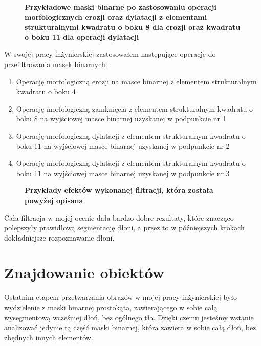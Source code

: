 \documentclass[a4paper,12pt,twoside,openany]{report}
\newcommand{\ImgPath}{.}
\begin{document}
\begin{figure}[H]
	\centering
	\caption{  \textbf{Przykładowe maski binarne po zastosowaniu operacji morfologicznych erozji oraz dylatacji z elementami strukturalnymi kwadratu o boku 8 dla erozji oraz kwadratu o boku 11 dla operacji dylatacji}}
\end{figure}

W swojej pracy inżynierskiej zastosowałem następujące operacje do przefiltrowania masek binarnych: 
\begin{enumerate}
	\item Operację morfologiczną erozji na masce binarnej z elementem strukturalnym kwadratu o boku 4
	\item Operację morfologiczną zamknięcia z elementem strukturalnym kwadratu o boku 8 na wyjściowej masce binarnej uzyskanej w podpunkcie nr 1
	\item Operację morfologiczną dylatacji z elementem strukturalnym kwadratu o boku 11 na wyjściowej masce binarnej uzyskanej w podpunkcie nr 2
	\item Operację morfologiczną dylatacji z elementem strukturalnym kwadratu o boku 11 na wyjściowej masce binarnej uzyskanej w podpunkcie nr 3
\end{enumerate}

\begin{figure}[H]
	\centering
	\caption{  \textbf{Przykłady efektów wykonanej filtracji, która została powyżej opisana}}
\end{figure}

Cała filtracja  w mojej ocenie dała bardzo dobre rezultaty, które znacząco polepszyły prawidłową segmentację dłoni, a przez to w późniejszych krokach dokładniejsze rozpoznawanie dłoni.

\section{Znajdowanie obiektów}
Ostatnim etapem przetwarzania obrazów w mojej pracy inżynierskiej było wydzielenie z maski binarnej prostokąta, zawierającego w sobie całą wysegmentową wcześniej dłoń, bez ogólnego tła. Dzięki czemu jesteśmy wstanie analizować jedynie tą część maski binarnej, która zawiera w sobie całą dłoń, bez zbędnych innych elementów.
\end{document}
